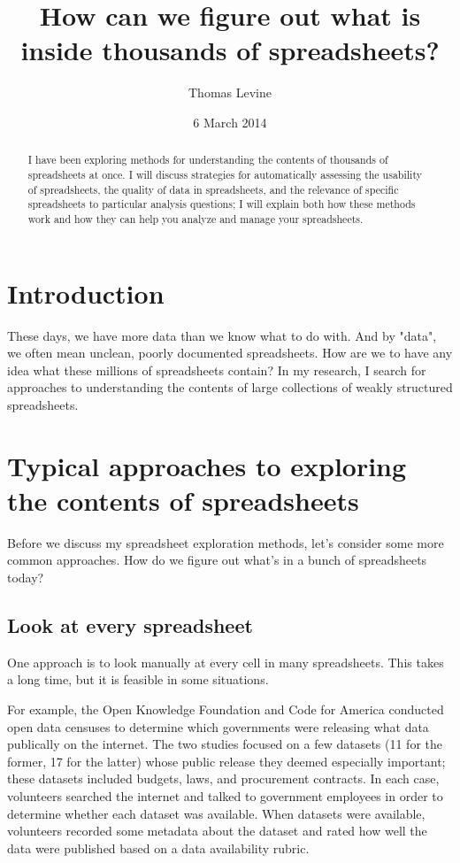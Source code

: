 \documentclass{acm_proc_article-sp}
\begin{document}
\title{How can we figure out what is inside thousands of spreadsheets?}
\author{ \alignauthor Thomas Levine\\  }
\date{6 March 2014}
\maketitle
\begin{abstract}
I have been exploring methods for understanding the contents
of thousands of spreadsheets at once. I will discuss strategies for automatically
assessing the usability of spreadsheets, the quality of data
in spreadsheets, and the relevance of specific spreadsheets to particular
analysis questions; I will explain both how these methods work and how they
can help you analyze and manage your spreadsheets.
\end{abstract}


\section{Introduction}
These days, we have more data than we know what to do with. And by "data",
we often mean unclean, poorly documented spreadsheets. How are we to have
any idea what these millions of spreadsheets contain? In my research,
I search for approaches to understanding the contents of large collections
of weakly structured spreadsheets.

\section{Typical approaches to exploring the contents of spreadsheets}
Before we discuss my spreadsheet exploration methods,
let's consider some more common approaches.
How do we figure out what's in a bunch of spreadsheets today?

\subsection{Look at every spreadsheet}
One approach is to look manually at every cell in many spreadsheets.
This takes a long time, but it is feasible in some situations.

For example, the Open Knowledge Foundation \cite{open-data-census}
and Code for America \cite{open-data-census-us}
conducted open data censuses to determine which governments were
releasing what data publically on the internet. The two studies
focused on a few datasets (11 for the former, 17 for the latter)
whose public release they deemed especially important; these datasets
included budgets, laws, and procurement contracts.
In each case, volunteers searched the internet and talked to
government employees in order to determine whether each dataset was
available. When datasets were available, volunteers recorded some
metadata about the dataset and rated how well the data were published
based on a data availability rubric.
\end{document}
